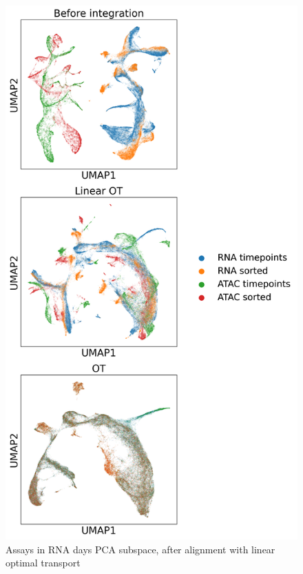 \documentclass[a4paper]{article}
\begin{document}
\begin{figure}[!htb]
  \centering
  \includegraphics[width=\textwidth]{../figures/hematopoiesis/assays_RNA_days_subspace_aligned.png}
  \caption{Assays in RNA days PCA subspace, after alignment with linear optimal transport}
\end{figure}
\end{document}
